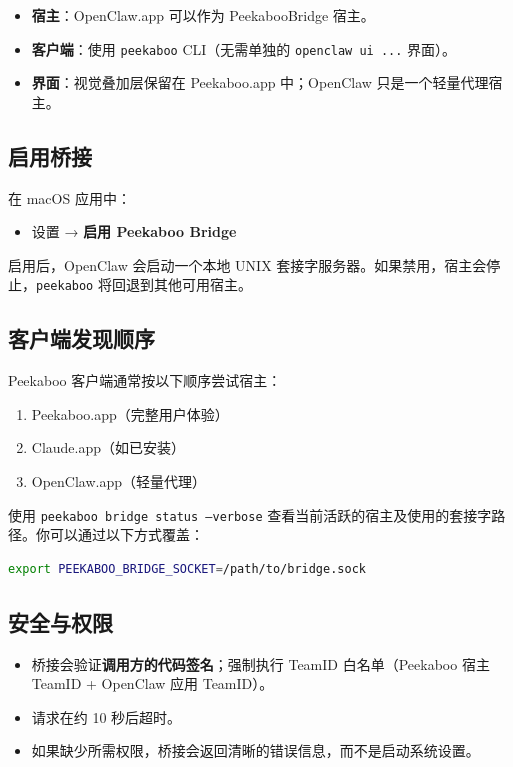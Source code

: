 \begin{itemize}
  \item \textbf{宿主}：OpenClaw.app 可以作为 PeekabooBridge 宿主。
  \item \textbf{客户端}：使用 \texttt{peekaboo} CLI（无需单独的 \texttt{openclaw ui ...} 界面）。
  \item \textbf{界面}：视觉叠加层保留在 Peekaboo.app 中；OpenClaw 只是一个轻量代理宿主。
\end{itemize}


\subsection{启用桥接}


在 macOS 应用中：

\begin{itemize}
  \item 设置 → \textbf{启用 Peekaboo Bridge}
\end{itemize}


启用后，OpenClaw 会启动一个本地 UNIX 套接字服务器。如果禁用，宿主会停止，\texttt{peekaboo} 将回退到其他可用宿主。

\subsection{客户端发现顺序}


Peekaboo 客户端通常按以下顺序尝试宿主：

\begin{enumerate}
  \item Peekaboo.app（完整用户体验）
  \item Claude.app（如已安装）
  \item OpenClaw.app（轻量代理）
\end{enumerate}


使用 \texttt{peekaboo bridge status --verbose} 查看当前活跃的宿主及使用的套接字路径。你可以通过以下方式覆盖：

\begin{lstlisting}[language=bash]
export PEEKABOO_BRIDGE_SOCKET=/path/to/bridge.sock
\end{lstlisting}


\subsection{安全与权限}


\begin{itemize}
  \item 桥接会验证\textbf{调用方的代码签名}；强制执行 TeamID 白名单（Peekaboo 宿主 TeamID + OpenClaw 应用 TeamID）。
  \item 请求在约 10 秒后超时。
  \item 如果缺少所需权限，桥接会返回清晰的错误信息，而不是启动系统设置。
\end{itemize}


